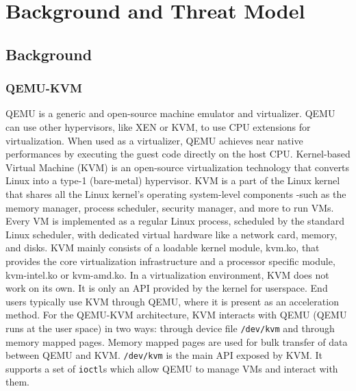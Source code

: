\section{Background and Threat Model}%
\label{sec:background_and_threat_model}



\subsection{Background}%
\label{sub:background}

\subsubsection{QEMU-KVM}%
\label{ssub:qemu_kvm}
QEMU is a generic and open-source machine emulator and virtualizer. QEMU can use other hypervisors, like XEN or KVM, to use CPU extensions for virtualization. When used as a virtualizer, QEMU achieves near native performances by executing the guest code directly on the host CPU.
Kernel-based Virtual Machine (KVM) is an open-source virtualization technology that converts Linux into a type-1 (bare-metal) hypervisor. KVM is a part of the Linux kernel that shares all the Linux kernel's operating system-level components -such as the memory manager, process scheduler, security manager, and more to run VMs. Every VM is implemented as a regular Linux process, scheduled by the standard Linux scheduler, with dedicated virtual hardware like a network card, memory, and disks. KVM mainly consists of a loadable kernel module, kvm.ko, that provides the core virtualization infrastructure and a processor specific module, kvm-intel.ko or kvm-amd.ko.
In a virtualization environment, KVM does not work on its own. It is only an API provided by the kernel for userspace. End users typically use KVM through QEMU, where it is present as an acceleration method.
For the QEMU-KVM architecture, KVM interacts with QEMU (QEMU runs at the user space) in two ways: through device file \verb|/dev/kvm| and through memory mapped pages.
Memory mapped pages are used for bulk transfer of data between QEMU and KVM. \verb|/dev/kvm| is the main API exposed by KVM. It supports a set of \verb|ioctl|s which allow QEMU to manage VMs and interact with them.



